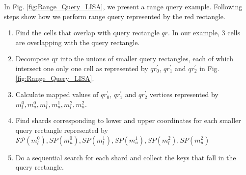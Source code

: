 \begin{mscexample}
	In Fig. \ref{fig:Range_Query_LISA}, we present a range query example. Following steps show how we perform range query represented by the red rectangle.
	\begin{enumerate}
		\item Find the cells that overlap with query rectangle $qr$. In our example, 3 cells are overlapping with the query rectangle. 
		\item Decompose qr into the unions of smaller query rectangles, each of which intersect one only one cell as represented by $qr_{0}^{'}$, $qr_{1}^{'}$ and $qr_{2}^{'}$ in Fig. \ref{fig:Range_Query_LISA}.
		
		\item Calculate mapped values of $qr_{0}^{'}$, $qr_{1}^{'}$ and $qr_{2}^{'}$ vertices represented by \\
		$m_{l}^{0}, m_{u}^{0}, m_{l}^{1}, m_{u}^{1}, m_{l}^{2}, m_{u}^{2} $.
		\item Find shards corresponding to lower and upper coordinates for each smaller query rectangle represented by 
		$\mathcal{SP}(m_{l}^{0}),SP{(m_{u}^{0})},{SP}(m_{l}^{1}),SP{(m_{u}^{1})}, {SP}(m_{l}^{2}),SP{(m_{u}^{2})} $
		\item Do a sequential search for  each shard and collect the keys that fall in the query rectangle. 
	\end{enumerate}
\end{mscexample}

